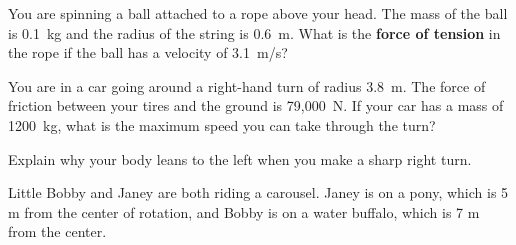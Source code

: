 \documentclass[10pt]{exam}
\begin{document}
\begin{questions}

\question
  You are spinning a ball attached to a rope above your head.  The mass of the ball is 0.1~kg and the radius of the string is 0.6~m. What is the {\bf force of tension} in the rope if the ball has a velocity of 3.1~m/s?
  \vs[2] 

\question
  You are in a car going around a right-hand turn of radius 3.8~m.  The force of friction between your tires and the ground is 79,000~N.  If your car has a mass of 1200~kg, what is the maximum speed you can take through the turn?

  \vs


\pagebreak

\question
  Explain why your body leans to the left when you make a sharp right turn.
  \vs


\question
  Little Bobby and Janey are both riding a carousel.  Janey is on a pony, which is 5 m from the center of rotation, and Bobby is on a water buffalo, which is 7 m from the center. \label{concept}
  
  \begin{multicols}{2}

\end{multicols}
\end{questions}
\end{document}
